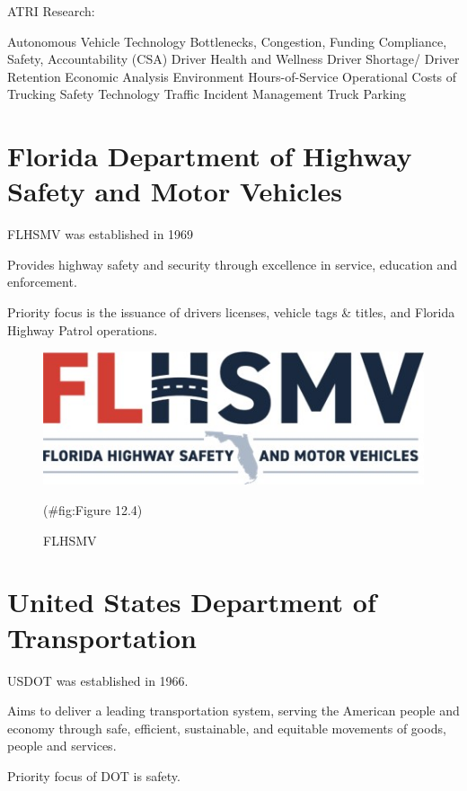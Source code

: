 \documentclass[
]{book}
\begin{document}
ATRI Research:

Autonomous Vehicle Technology
Bottlenecks, Congestion, Funding
Compliance, Safety, Accountability (CSA)
Driver Health and Wellness
Driver Shortage/ Driver Retention
Economic Analysis
Environment
Hours-of-Service
Operational Costs of Trucking
Safety
Technology
Traffic Incident Management
Truck Parking

\hypertarget{organization-highwaysafety}{%
\section{Florida Department of Highway Safety and Motor Vehicles}\label{organization-highwaysafety}}

FLHSMV was established in 1969

Provides highway safety and security through excellence in service, education and enforcement.

Priority focus is the issuance of drivers licenses, vehicle tags \& titles, and Florida Highway Patrol operations.

\begin{figure}

{\centering \includegraphics{./Images/Research organizations/FLHSMV} 

}

\caption{FLHSMV}(\#fig:Figure 12.4)
\end{figure}

\hypertarget{organization-usdot}{%
\section{United States Department of Transportation}\label{organization-usdot}}

USDOT was established in 1966.

Aims to deliver a leading transportation system, serving the American people and economy through safe, efficient, sustainable, and equitable movements of goods, people and services.

Priority focus of DOT is safety.
\end{document}
